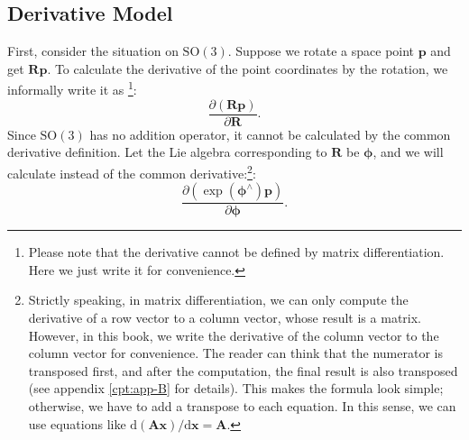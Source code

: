 \subsection{Derivative Model}
First, consider the situation on $\mathrm{SO}(3)$. Suppose we rotate a space point $\mathbf{p}$ and get $\mathbf{R} \mathbf{p}$. To calculate the derivative of the point coordinates by the rotation, we informally write it as \footnote{Please note that the derivative cannot be defined by matrix differentiation. Here we just write it for convenience. }:
\[
\frac{{\partial \left( {\mathbf{Rp}} \right)}}{{\partial \mathbf{R}}}.
\]
Since $\mathrm{SO}(3)$ has no addition operator, it cannot be calculated by the common derivative definition. Let the Lie algebra corresponding to $\mathbf{R}$ be $\boldsymbol{\phi}$, and we will calculate instead of the common derivative:\footnote{Strictly speaking, in matrix differentiation, we can only compute the derivative of a row vector to a column vector, whose result is a matrix. However, in this book, we write the derivative of the column vector to the column vector for convenience. The reader can think that the numerator is transposed first, and after the computation, the final result is also transposed (see appendix \ref{cpt:app-B} for details). This makes the formula look simple; otherwise, we have to add a transpose to each equation. In this sense, we can use equations like $\mathrm{d}(\mathbf{Ax})/\mathrm{d}\mathbf{x} = \mathbf{A}$. }:
\[ \frac{{\partial \left( {\exp \left( \boldsymbol{\phi} ^ \wedge \right) \mathbf{p}} \right)}}{{\partial \boldsymbol{\phi} }}. \]

